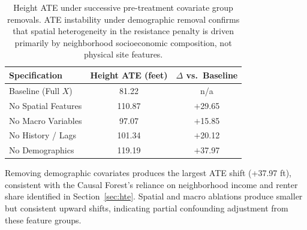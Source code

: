 \begin{table}[H]
\centering
\caption[Feature Group Ablation Study]{Height ATE under successive pre-treatment covariate group removals. ATE instability under demographic removal confirms that spatial heterogeneity in the resistance penalty is driven primarily by neighborhood socioeconomic composition, not physical site features.}
\label{tab:ablation}
\begin{tabular}{lcc}
\toprule
\textbf{Specification} & \textbf{Height ATE (feet)} & \textbf{$\Delta$ vs.\ Baseline} \\
\midrule
Baseline (Full $X$)  & \phantom{$-$}81.22  & n/a              \\
No Spatial Features  & 110.87              & $+$29.65         \\
No Macro Variables   & \phantom{$-$}97.07  & $+$15.85         \\
No History / Lags    & 101.34              & $+$20.12         \\
No Demographics      & 119.19              & $+$37.97         \\
\bottomrule
\end{tabular}
\par\smallskip
\footnotesize Removing demographic covariates produces the largest ATE shift (+37.97 ft), consistent with the Causal Forest's reliance on neighborhood income and renter share identified in Section~\ref{sec:hte}. Spatial and macro ablations produce smaller but consistent upward shifts, indicating partial confounding adjustment from these feature groups.
\end{table}
